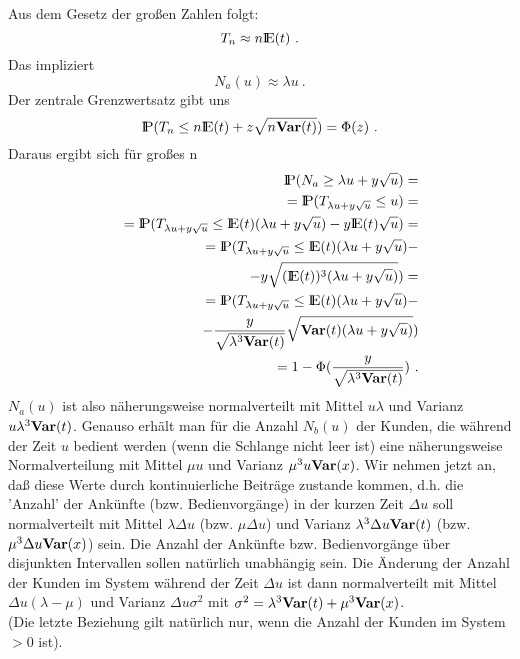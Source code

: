 \begin{enumerate}
Aus dem Gesetz der großen Zahlen folgt:
\[ T_{n} \approx n{\rm I\kern-0.2em E}(t) ~.\]
Das impliziert
\[N_{a}(u) \approx \lambda u ~. \]
Der zentrale Grenzwertsatz gibt uns
\[{\rm I\kern-0.2em P}(T_{n} \leq n{\rm I\kern-0.2em E}(t)+z\sqrt{n{\bf Var}(t)}) = \Phi (z) ~.   \]
Daraus ergibt sich für großes n
\begin{eqnarray*}
& &{\rm I\kern-0.2em P}(N_{a}\geq\lambda u + y\sqrt{u}) = \\
& & ~ ~={\rm I\kern-0.2em P}(T_{\lambda u + y\sqrt{u}} \leq u) = \\
& & ~ ~={\rm I\kern-0.2em P}(T_{\lambda u + y\sqrt{u}} \leq {\rm I\kern-0.2em E}(t)(\lambda u + y\sqrt{u}) - y{\rm I\kern-0.2em E}(t)\sqrt{u} ) = \\
& & ~ ~={\rm I\kern-0.2em P}(T_{\lambda u + y\sqrt{u}} \leq {\rm I\kern-0.2em E}(t)(\lambda u + y\sqrt{u}) - \\
& & ~ ~ ~ ~ ~- y\sqrt{({\rm I\kern-0.2em E}(t))^{3}(\lambda u + y\sqrt{u})})=\\
& &~ ~={\rm I\kern-0.2em P}(T_{\lambda u + y\sqrt{u}} \leq {\rm I\kern-0.2em E}(t)(\lambda u + y\sqrt{u}) - \\
& & ~ ~ ~ ~ ~-\frac{y}{\sqrt{\lambda ^{3}{\bf Var}(t)}}\sqrt{{\bf Var}(t)(\lambda u + y\sqrt{u})}) \\
& &~ ~=1 - \Phi(\frac{y}{\sqrt{\lambda ^{3}{\bf Var}(t)}}) ~.
\end{eqnarray*}
$N_{a}(u)$ ist also näherungsweise normalverteilt mit Mittel $u\lambda$ und Varianz $u\lambda^{3}{\bf Var}(t)$. Genauso erhält man für die Anzahl $N_{b}(u)$
der
Kunden, die während der Zeit $u$ bedient werden (wenn die Schlange nicht leer ist) eine näherungsweise Normalverteilung mit Mittel $\mu u$ und Varianz
$\mu^{3}u{\bf Var}(x)$. Wir nehmen jetzt an, daß diese Werte durch kontinuierliche Beiträge zustande kommen, d.h. die 'Anzahl' der Ankünfte (bzw.
Bedienvorgänge)
in der kurzen Zeit $\Delta u$ soll normalverteilt mit Mittel $\lambda\Delta u$ (bzw. $\mu\Delta u$) und Varianz $\lambda^{3}\Delta u{\bf Var}(t)$ (bzw.
$\mu^{3}\Delta
u{\bf Var}(x)$) sein. Die Anzahl der Ankünfte bzw. Bedienvorgänge über disjunkten Intervallen sollen natürlich unabhängig sein. Die Änderung der Anzahl der
Kunden
im System während der Zeit $\Delta u$ ist dann normalverteilt mit Mittel $\Delta u(\lambda - \mu)$ und Varianz $\Delta u\sigma^{2}$ mit $\sigma^{2} =
\lambda^{3}{\bf Var}(t) + \mu^{3}{\bf Var}(x)$.\\
(Die letzte Beziehung gilt natürlich nur, wenn die Anzahl der Kunden im System $> 0$ ist).


\end{enumerate}
